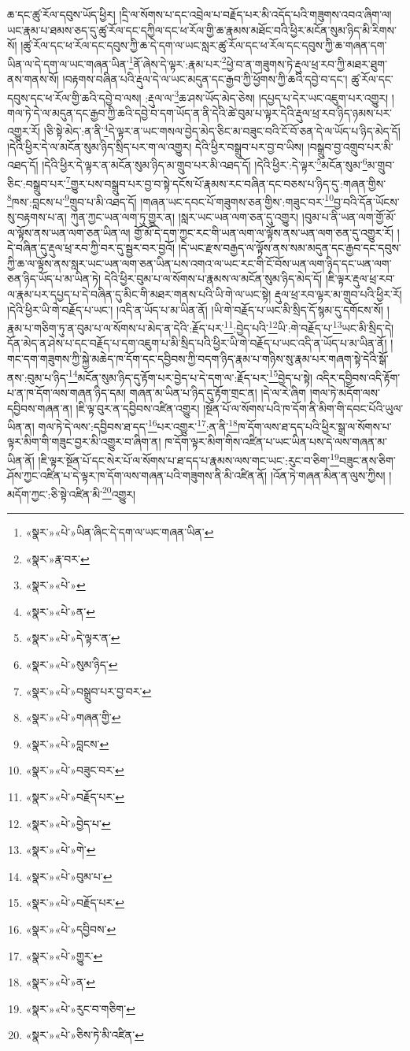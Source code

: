 ཆ་དང་ཚུ་རོལ་དབུས་ཡོད་ཕྱིར། །དྲི་ལ་སོགས་པ་དང་འབྲེལ་པ་བརྗོད་པར་མི་འདོད་པའི་གཟུགས་འབའ་ཞིག་ལ། ཡང་རྣམ་པ་ཐམས་ཅད་དུ་ཚུ་རོལ་དང་དཀྱིལ་དང་ཕ་རོལ་གྱི་ཆ་རྣམས་མཐོང་བའི་ཕྱིར་མངོན་སུམ་ཉིད་མི་རིགས་སོ། །ཚུ་རོལ་དང་ཕ་རོལ་དང་དབུས་ཀྱི་ཆ་དེ་དག་ལ་ཡང་སླར་ཚུ་རོལ་དང་ཕ་རོལ་དང་དབུས་ཀྱི་ཆ་གཞན་དག་ཡིན་ལ་དེ་དག་ལ་ཡང་གཞན་ཡིན་\footnote{«སྣར་»«པེ་»ཡིན་ཞིང་དེ་དག་ལ་ཡང་གཞན་ཡིན་}ནོ་ཞེས་དེ་ལྟར་:རྣམ་པར་\footnote{«སྣར་»རྣ་བར་}ཕྱེ་བ་ན་གཟུགས་ཏེ་རྡུལ་ཕྲ་རབ་ཀྱི་མཐར་ཐུག་ནས་གནས་སོ། །བརྟགས་བཞིན་པའི་རྡུལ་དེ་ལ་ཡང་མདུན་དང་རྒྱབ་ཀྱི་ཕྱོགས་ཀྱི་ཆའི་དབྱེ་བ་དང་། ཚུ་རོལ་དང་དབུས་དང་ཕ་རོལ་གྱི་ཆའི་དབྱེ་བ་ལས། :རྡུལ་ལ་\footnote{«སྣར་»«པེ་»}ཆ་ཤས་ཡོད་མེད་ཅེས། །དཔྱད་པ་དེར་ཡང་འཇུག་པར་འགྱུར། །གལ་ཏེ་དེ་ལ་མདུན་དང་རྒྱབ་ཀྱི་ཆའི་དབྱེ་བ་དག་ཡོད་ན་ནི་དེའི་ཚེ་བུམ་པ་ལྟར་དེའི་རྡུལ་ཕྲ་རབ་ཉིད་ཉམས་པར་འགྱུར་རོ། །ཅི་སྟེ་མེད་:ན་ནི་\footnote{«སྣར་»«པེ་»ན་}དེ་ལྟར་ན་ཡང་གསལ་བྱེད་མེད་ཅིང་མ་བཟུང་བའི་ངོ་བོ་ཅན་དེ་ལ་ཡོད་པ་ཉིད་མེད་དོ། །དེའི་ཕྱིར་དེ་ལ་མངོན་སུམ་ཉིད་སྲིད་པར་ག་ལ་འགྱུར། དེའི་ཕྱིར་བསྒྲུབ་པར་བྱ་བ་ཡིས། །བསྒྲུབ་བྱ་འགྲུབ་པར་མི་འཐད་དོ། །དེའི་ཕྱིར་དེ་ལྟར་ན་མངོན་སུམ་ཉིད་མ་གྲུབ་པར་མི་འཐད་དོ། །དེའི་ཕྱིར་:དེ་ལྟར་\footnote{«སྣར་»«པེ་»དེ་ལྟར་ན་}མངོན་སུམ་\footnote{«སྣར་»«པེ་»སུམ་ཉིད་}མ་གྲུབ་ཅིང་:བསྒྲུབ་པར་\footnote{«སྣར་»«པེ་»བསྒྲུབ་པར་བྱ་བར་}གྱུར་པས་བསྒྲུབ་པར་བྱ་བ་སྟེ་དངོས་པོ་རྣམས་རང་བཞིན་དང་བཅས་པ་ཉིད་དུ་:གཞན་གྱིས་\footnote{«སྣར་»«པེ་»གཞན་གྱི་}ཁས་:བླངས་པ་\footnote{«སྣར་»«པེ་»བླངས་}གྲུབ་པ་མི་འཐད་དོ། །གཞན་ཡང་དབང་པོ་གཟུགས་ཅན་གྱིས་:གཟུང་བར་\footnote{«སྣར་»«པེ་»བཟུང་བར་}བྱ་བའི་དོན་ཡོངས་སུ་བརྟགས་པ་ན། ཀུན་ཀྱང་ཡན་ལག་ཏུ་གྱུར་ན། །སླར་ཡང་ཡན་ལག་ཅན་དུ་འགྱུར། །བུམ་པ་ནི་ཡན་ལག་གྱོ་མོ་ལ་ལྟོས་ནས་ཡན་ལག་ཅན་ཡིན་ལ། གྱོ་མོ་དེ་དག་ཀྱང་རང་གི་ཡན་ལག་ལ་ལྟོས་ནས་ཡན་ལག་ཅན་དུ་འགྱུར་རོ། །དེ་བཞིན་དུ་རྡུལ་ཕྲ་རབ་ཀྱི་བར་དུ་སྦྱར་བར་བྱའོ། །དེ་ཡང་རྫས་བརྒྱད་ལ་ལྟོས་ནས་སམ་མདུན་དང་རྒྱབ་དང་དབུས་ཀྱི་ཆ་ལ་ལྟོས་ནས་སླར་ཡང་ཡན་ལག་ཅན་ཡིན་པས་འགའ་ལ་ཡང་རང་གི་ངོ་བོས་ཡན་ལག་ཉིད་དང་ཡན་ལག་ཅན་ཉིད་ཡོད་པ་མ་ཡིན་ཏེ། དེའི་ཕྱིར་བུམ་པ་ལ་སོགས་པ་རྣམས་ལ་མངོན་སུམ་ཉིད་མེད་དོ། །ཇི་ལྟར་རྡུལ་ཕྲ་རབ་ལ་རྣམ་པར་དཔྱད་པ་དེ་བཞིན་དུ་མིང་གི་མཐར་གནས་པའི་ཡི་གེ་ལ་ཡང་སྟེ། རྡུལ་ཕྲ་རབ་ལྟར་མ་གྲུབ་པའི་ཕྱིར་རོ། །དེའི་ཕྱིར་ཡི་གེ་བརྗོད་པ་ཡང་། །འདི་ན་ཡོད་པ་མ་ཡིན་ནོ། །ཡི་གེ་བརྗོད་པ་ཡང་མི་སྲིད་དོ་སྙམ་དུ་དགོངས་སོ། །རྣམ་པ་གཅིག་ཏུ་ན་བུམ་པ་ལ་སོགས་པ་མེད་ན་དེའི་:རྗོད་པར་\footnote{«སྣར་»«པེ་»བརྗོད་པར་}:བྱེད་པའི་\footnote{«སྣར་»«པེ་»བྱེད་པ་}ཡི་:གེ་བརྗོད་པ་\footnote{«སྣར་»«པེ་»གེ་}ཡང་མི་སྲིད་དེ། དོན་མེད་ན་ཤེས་པ་དང་བརྗོད་པ་དག་འཇུག་པ་མི་སྲིད་པའི་ཕྱིར་ཡི་གེ་བརྗོད་པ་ཡང་འདི་ན་ཡོད་པ་མ་ཡིན་ནོ། །གང་དག་གཟུགས་ཀྱི་སྐྱེ་མཆེད་ཁ་དོག་དང་དབྱིབས་ཀྱི་བདག་ཉིད་རྣམ་པ་གཉིས་སུ་རྣམ་པར་གཞག་སྟེ་དེའི་སྒོ་ནས་:བུམ་པ་ཉིད་\footnote{«སྣར་»«པེ་»བུམ་པ་}མངོན་སུམ་ཉིད་དུ་རྟོག་པར་བྱེད་པ་དེ་དག་ལ་:རྗོད་པར་\footnote{«སྣར་»«པེ་»བརྗོད་པར་}བྱེད་པ་སྟེ། འདིར་དབྱིབས་འདི་རྟོག་པ་ན་ཁ་དོག་ལས་གཞན་ཉིད་དམ། གཞན་མ་ཡིན་པ་ཉིད་དུ་རྟོག་གྲང་ན། །དེ་ལ་རེ་ཞིག །གལ་ཏེ་མདོག་ལས་དབྱིབས་གཞན་ན། །ཇི་ལྟ་བུར་ན་དབྱིབས་འཛིན་འགྱུར། །སྔོན་པོ་ལ་སོགས་པའི་ཁ་དོག་ནི་མིག་གི་དབང་པོའི་ཡུལ་ཡིན་ན། གལ་ཏེ་དེ་ལས་:དབྱིབས་ཐ་དད་\footnote{«སྣར་»«པེ་»དབྱིབས་}པར་འགྱུར་\footnote{«སྣར་»«པེ་»གྱུར་}:ན་ནི་\footnote{«སྣར་»«པེ་»ན་}ཁ་དོག་ལས་ཐ་དད་པའི་ཕྱིར་སྒྲ་ལ་སོགས་པ་ལྟར་མིག་གི་གཟུང་བྱར་མི་འགྱུར་བ་ཞིག་ན། ཁ་དོག་ལྟར་མིག་གིས་འཛིན་པ་ཡང་ཡིན་པས་དེ་ལས་གཞན་མ་ཡིན་ནོ། །ཇི་ལྟར་སྔོན་པོ་དང་སེར་པོ་ལ་སོགས་པ་ཐ་དད་པ་རྣམས་ལས་གང་ཡང་:རུང་བ་ཅིག་\footnote{«སྣར་»«པེ་»རུང་བ་གཅིག་}བཟུང་ནས་ཅིག་ཤོས་ཀྱང་འཛིན་པ་དེ་ལྟར་ཁ་དོག་ལས་གཞན་པའི་གཟུགས་ནི་མི་འཛིན་ནོ། །འོན་ཏེ་གཞན་མིན་ན་ལུས་ཀྱིས། །མདོག་ཀྱང་:ཅི་སྟེ་འཛིན་མི་\footnote{«སྣར་»«པེ་»ཅིས་ཏེ་མི་འཛིན་}འགྱུར། 